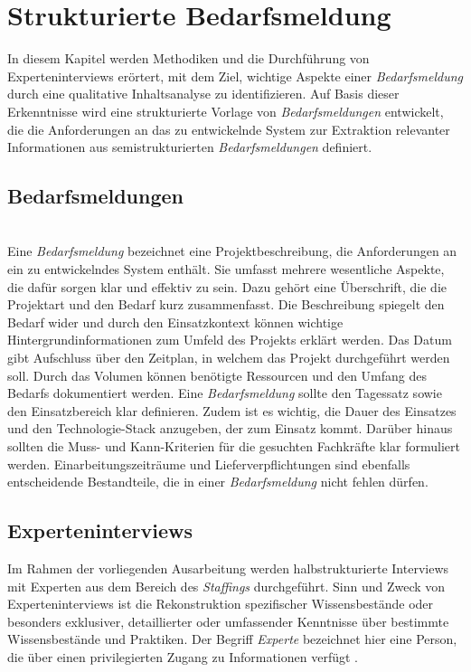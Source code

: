 \chapter{Strukturierte Bedarfsmeldung}
\label{chap:erwartungshaltung}
In diesem Kapitel werden Methodiken und die Durchführung von Experteninterviews erörtert, mit dem Ziel, wichtige Aspekte einer \emph{Bedarfsmeldung} durch eine qualitative Inhaltsanalyse zu identifizieren. Auf Basis dieser Erkenntnisse wird eine strukturierte Vorlage von \emph{Bedarfsmeldungen} entwickelt, die die Anforderungen an das zu entwickelnde System zur Extraktion relevanter Informationen aus semistrukturierten \emph{Bedarfsmeldungen} definiert.
\section{Bedarfsmeldungen}\mbox{} \\
Eine \emph{Bedarfsmeldung} bezeichnet eine Projektbeschreibung, die Anforderungen an ein zu entwickelndes System enthält. Sie umfasst mehrere wesentliche Aspekte, die dafür sorgen klar und effektiv zu sein. Dazu gehört eine Überschrift, die die Projektart und den Bedarf kurz zusammenfasst. Die Beschreibung spiegelt den Bedarf wider und durch den Einsatzkontext können wichtige Hintergrundinformationen zum Umfeld des Projekts erklärt werden. Das Datum gibt Aufschluss über den Zeitplan, in welchem das Projekt durchgeführt werden soll. Durch das Volumen können benötigte Ressourcen und den Umfang des Bedarfs dokumentiert werden. Eine \emph{Bedarfsmeldung} sollte den Tagessatz sowie den Einsatzbereich klar definieren. Zudem ist es wichtig, die Dauer des Einsatzes und den Technologie-Stack anzugeben, der zum Einsatz kommt. Darüber hinaus sollten die Muss- und Kann-Kriterien für die gesuchten Fachkräfte klar formuliert werden. Einarbeitungszeiträume und Lieferverpflichtungen sind ebenfalls entscheidende Bestandteile, die in einer \emph{Bedarfsmeldung} nicht fehlen dürfen.\\
\section{Experteninterviews}
\label{sec:beschreibung-der-interviews}
Im Rahmen der vorliegenden Ausarbeitung werden halbstrukturierte Interviews mit Experten aus dem Bereich des \emph{Staffings} durchgeführt. Sinn und Zweck von Experteninterviews ist die Rekonstruktion spezifischer Wissensbestände oder besonders exklusiver, detaillierter oder umfassender Kenntnisse über bestimmte Wissensbestände und Praktiken. Der Begriff \emph{Experte} bezeichnet hier eine Person, die über einen privilegierten Zugang zu Informationen verfügt \cite{pfadenhauer2009eye}.\\ 

